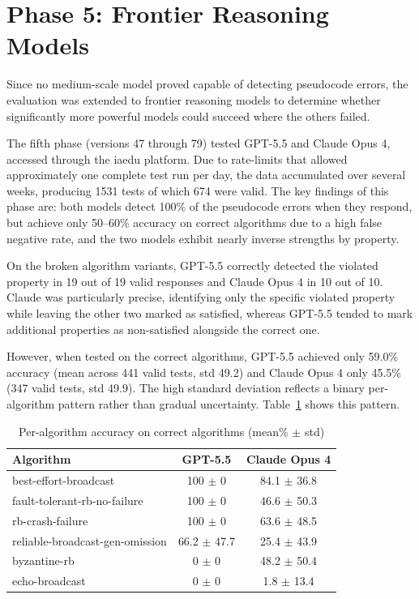 \documentclass[conference]{IEEEtran}
\begin{document}
\section{Phase 5: Frontier Reasoning Models}

Since no medium-scale model proved capable of detecting pseudocode errors, the evaluation was extended to frontier reasoning models to determine whether significantly more powerful models could succeed where the others failed.

The fifth phase (versions 47 through 79) tested GPT-5.5 and Claude Opus 4, accessed through the iaedu platform. Due to rate-limits that allowed approximately one complete test run per day, the data accumulated over several weeks, producing 1531 tests of which 674 were valid. The key findings of this phase are: both models detect 100\% of the pseudocode errors when they respond, but achieve only 50--60\% accuracy on correct algorithms due to a high false negative rate, and the two models exhibit nearly inverse strengths by property.

On the broken algorithm variants, GPT-5.5 correctly detected the violated property in 19 out of 19 valid responses and Claude Opus 4 in 10 out of 10. Claude was particularly precise, identifying only the specific violated property while leaving the other two marked as satisfied, whereas GPT-5.5 tended to mark additional properties as non-satisfied alongside the correct one.

However, when tested on the correct algorithms, GPT-5.5 achieved only 59.0\% accuracy (mean across 441 valid tests, std 49.2) and Claude Opus 4 only 45.5\% (347 valid tests, std 49.9). The high standard deviation reflects a binary per-algorithm pattern rather than gradual uncertainty. Table~\ref{tab:model-algo} shows this pattern.

\begin{table}[h]
\centering
\caption{Per-algorithm accuracy on correct algorithms (mean\% $\pm$ std)}
\label{tab:model-algo}
\begin{tabular}{|l|c|c|}
\hline
\textbf{Algorithm} & \textbf{GPT-5.5} & \textbf{Claude Opus 4} \\
\hline
best-effort-broadcast & 100 $\pm$ 0 & 84.1 $\pm$ 36.8 \\
fault-tolerant-rb-no-failure & 100 $\pm$ 0 & 46.6 $\pm$ 50.3 \\
rb-crash-failure & 100 $\pm$ 0 & 63.6 $\pm$ 48.5 \\
reliable-broadcast-gen-omission & 66.2 $\pm$ 47.7 & 25.4 $\pm$ 43.9 \\
byzantine-rb & 0 $\pm$ 0 & 48.2 $\pm$ 50.4 \\
echo-broadcast & 0 $\pm$ 0 & 1.8 $\pm$ 13.4 \\
\hline
\end{tabular}
\end{table}
\end{document}
